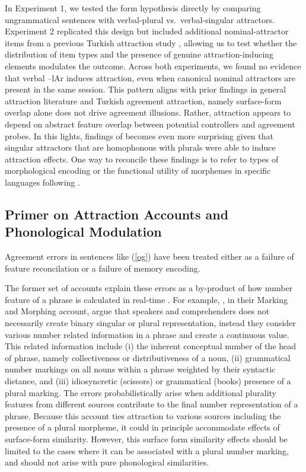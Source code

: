 \documentclass[
  authoryear,
  3p]{elsarticle}
\begin{document}
In Experiment 1, we tested the form hypothesis directly by comparing
ungrammatical sentences with verbal-plural vs.~verbal-singular
attractors. Experiment 2 replicated this design but included additional
nominal-attractor items from a previous Turkish attraction study
\citep{TurkLogacev2024}, allowing us to test whether the distribution of
item types and the presence of genuine attraction-inducing elements
modulates the outcome. Across both experiments, we found no evidence
that verbal --lAr induces attraction, even when canonical nominal
attractors are present in the same session. This pattern aligns with
prior findings in general attraction literature and Turkish agreement
attraction, namely surface-form overlap alone does not drive agreement
illusions. Rather, attraction appears to depend on abstract feature
overlap between potential controllers and agreement probes. In this
lights, findings of \citet{Slioussar2018} becomes even more surprising
given that singular attractors that are homophonous with plurals were
able to induce attraction effects. One way to reconcile these findings
is to refer to types of morphological encoding or the functional utility
of morphemes in specific languages following \citet{DillonKeshev2024}.

\subsection{Primer on Attraction Accounts and Phonological
Modulation}\label{primer-on-attraction-accounts-and-phonological-modulation}

Agreement errors in sentences like (\ref{og}) have been treated either
as a failure of feature reconcilation or a failure of memory encoding.

The former set of accounts explain these errors as a by-product of how
number feature of a phrase is calculated in real-time
\citep{BockMiller:1991, EberhardEtAl2005, HammerlyEtAl2019}. For
example, \citet{EberhardEtAl2005}, in their Marking and Morphing
account, argue that speakers and comprehenders does not necessarily
create binary singular or plural representation, instead they consider
various number related information in a phrase and create a continuous
value. This related information include (i) the inherent conceptual
number of the head of phrase, namely collectiveness or distributiveness
of a noun, (ii) grammatical number markings on all nouns within a phrase
weighted by their syntactic distance, and (iii) idiosyncretic (scissors)
or grammatical (books) presence of a plural marking. The errors
probabilistically arise when additional plurality features from
different sources contribute to the final number representation of a
phrase. Because this account ties attraction to various sources
including the presence of a plural morpheme, it could in principle
accommodate effects of surface-form similarity. However, this surface
form similarity effects should be limited to the cases where it can be
associated with a plural number marking, and should not arise with pure
phonological similarities.
\end{document}
